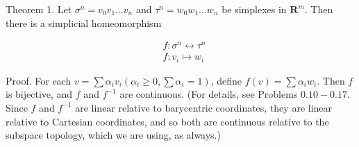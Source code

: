 Theorem 1. Let $\sigma^{n}=v_{0} v_{1} \ldots v_{n}$ and $\tau^{n}=w_{0} w_{1} \ldots w_{n}$ be simplexes in $\mathbf{R}^{m}$. Then there is a simplicial homeomorphism

$$
\begin{aligned}
& f: \sigma^{n} \leftrightarrow \tau^{n} \\
& f: v_{i} \mapsto w_{i}
\end{aligned}
$$

Proof. For each $v=\sum \alpha_{i} v_{i}\left(\alpha_{i} \geqslant 0, \sum \alpha_{i}=1\right)$, define $f(v)=\sum \alpha_{i} w_{i}$. Then $f$ is bijective, and $f$ and $f^{-1}$ are continuous. (For details, see Problems $0.10-0.17$. Since $f$ and $f^{-1}$ are linear relative to barycentric coordinates, they are linear relative to Cartesian coordinates, and so both are continuous relative to the subspace topology, which we are using, as always.)
